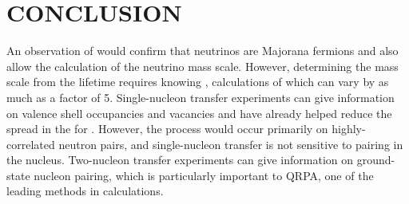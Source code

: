 %
%
%
%
%
%
%
%

%
%

\chapter{CONCLUSION}
\label{chap:conclude}
\begin{comment}
Review the importance of accurate NME for \zvbb searches
Review the importance of two-nucleon transfer reactions in general and two-proton transfer reactions to NME calculations

Thanks to the construction of a cosmic veto shield, we were able to obtain a measurement of the 74,76Ge(3He,n) cross section (300 $\mu$ barns/sr at 0$\circ$, 150 $\mu$ barns/sr at 0$\circ$, respectively) and place a limit on excited 0+ states to within 15\%.

The implication of this work for NME calculations are that ????  Dude seriously you need to be able to say something about this.
\end{comment}
An observation of \zvbb would confirm that neutrinos are Majorana fermions and also allow the calculation of the neutrino mass scale.  However, determining the mass scale from the \zvbb lifetime requires knowing \NME, calculations of which can vary by as much as a factor of 5.  Single-nucleon transfer experiments can give information on valence shell occupancies and vacancies and have already helped reduce the spread in the \NME for .  However, the \zvbb process would occur primarily on highly-correlated neutron pairs, and single-nucleon transfer is not sensitive to pairing in the nucleus.  Two-nucleon transfer experiments can give information on ground-state nucleon pairing, which is particularly important to QRPA, one of the leading methods in \NME calculations.

